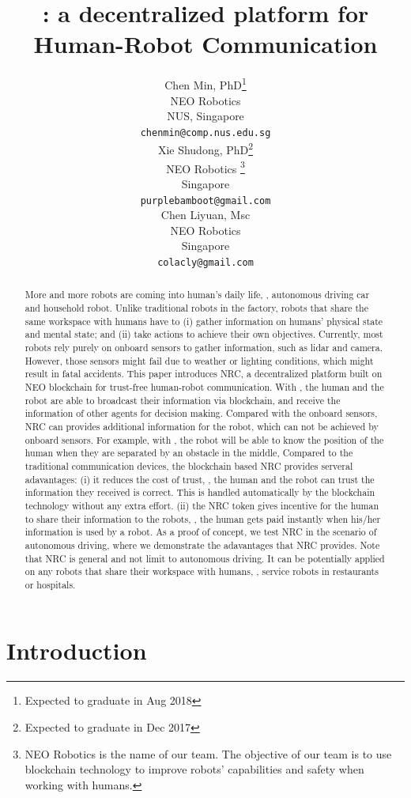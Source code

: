 \documentclass{article}
\title{\nrc: a decentralized platform for Human-Robot Communication}
\author{
  Chen Min, PhD\thanks{Expected to graduate in Aug 2018}\\
  NEO Robotics
  \\
  NUS, Singapore\\
  \texttt{chenmin@comp.nus.edu.sg} \\
  \And
  Xie Shudong, PhD\thanks{Expected to graduate in Dec 2017}\\
  NEO Robotics
  \thanks{NEO Robotics is the name of our team.
      The objective of our team is to use blockchain technology
      to improve robots' capabilities and safety when working 
      with humans.}
  \\
  Singapore\\
  \texttt{purplebamboot@gmail.com} \\
  \And
  Chen Liyuan, Msc\\
  NEO Robotics\\
  Singapore\\
  \texttt{colacly@gmail.com} \\
}
\begin{document}

\maketitle

\begin{abstract}
	
More and more robots are coming into human's daily life,
\eg, autonomous driving car and household robot.
Unlike traditional robots in the factory, robots that share the
same workspace with humans have to (i) gather information on humans'
physical state and mental state;
and (ii) take actions to achieve their own objectives.
Currently, most robots rely purely on onboard sensors to gather 
information, such as lidar and camera.
However, those sensors might fail due to weather or lighting
conditions, which might result in fatal accidents.
This paper introduces NRC, 
a decentralized platform built on NEO blockchain
for trust-free human-robot communication.
With \nrc, the human and the robot are able to broadcast their
information via blockchain, and receive the 
information of other agents for decision making.
Compared with the onboard sensors, NRC can provides additional 
information for the robot, which can not be achieved by onboard
sensors.
For example, with \nrc, the robot will be able to know the 
position of the
human when they are separated by an obstacle in the middle, 
Compared to the traditional communication devices, the blockchain based
NRC provides serveral adavantages:
(i) it reduces the cost of trust, \ie, the human and the robot can trust
the information they received is correct. This is handled automatically
by the blockchain technology without any extra effort.
(ii) the NRC token gives incentive for the human to share
their information to the robots, \ie, the human gets paid instantly
when his/her information is used by a robot.
As a proof of concept, we test NRC in the scenario of autonomous driving,
where we demonstrate the adavantages that NRC provides.
Note that NRC is general and not limit to autonomous driving. 
It can
be potentially applied on any robots that share their workspace
with humans, \eg, service robots in restaurants or hospitals.
 
\end{abstract}


\section{Introduction}
\end{document}
